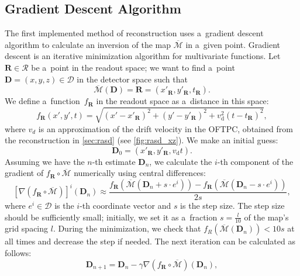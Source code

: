 		\subsection{Gradient Descent Algorithm}
		\label{sec:grad}			
			The first implemented method of reconstruction uses a~gradient descent algorithm to calculate an inversion of the map $\overline{\mathcal{M}}$ in a~given point. Gradient descent is an iterative minimization algorithm for multivariate functions. Let $\mathbf{R}\in\mathcal{R}$ be a~point in the readout space; we want to find a~point $\mathbf{D} = (x,y,z) \in\mathcal{D}$ in the detector space such that 
				\begin{equation}
					\overline{\mathcal{M}}(\mathbf{D}) = \mathbf{R} = (x'_\mathbf{R},y'_\mathbf{R},t_\mathbf{R}).
				\end{equation}
			We define a~function~$f_\mathbf{R}$ in the readout space as a~distance in this space:
				\begin{equation}
					f_\mathbf{R}(x',y',t) = \sqrt{(x'-x'_\mathbf{R})^2+(y'-y'_\mathbf{R})^2+v_\text{d}^2(t-t_\mathbf{R})^2},
				\end{equation}
			where $v_d$ is an approximation of the drift velocity in the \ac{OFTPC}, obtained from the reconstruction in \cref{sec:rasd} (see \cref{fig:rasd_xz}). We make an initial guess:
				\begin{equation}
					\mathbf{D}_0 = (x'_\mathbf{R},y'_\mathbf{R},v_\text{d}t).
				\end{equation}
			Assuming we have the $n$-th estimate $\mathbf{D}_n$, we calculate the $i$-th component of the gradient of $f_\mathbf{R}\circ\overline{\mathcal{M}}$ numerically using central differences:
				\begin{equation}
					\left[\nabla(f_\mathbf{R}\circ\overline{\mathcal{M}})\right]^i(\mathbf{D}_n) \approx \frac{f_\mathbf{R}(\overline{\mathcal{M}}(\mathbf{D}_n+s\cdot e^i))-f_\mathbf{R}(\overline{\mathcal{M}}(\mathbf{D}_n-s\cdot e^i))}{2s},
				\end{equation}
			where $e^i\in\mathcal{D}$ is the $i$-th coordinate vector and $s$ is the step size. The step size should be sufficiently small; initially, we set it as a~fraction $s = \frac{l}{10}$ of the map's grid spacing $l$. During the minimization, we check that $f_R(\overline{\mathcal{M}}(\mathbf{D}_n))<10s$ at all times and decrease the step if needed. The next iteration can be calculated as follows:
				\begin{equation}
					\mathbf{D}_{n+1} = \mathbf{D}_n - \gamma \nabla(f_\mathbf{R}\circ\overline{\mathcal{M}})(\mathbf{D}_n),
				\end{equation}
